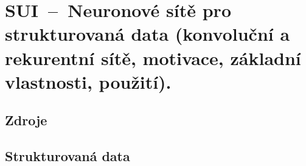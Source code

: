 

\graphicspath{{sui/neuronove_site_pro_strukturovana_data/figures}}


\chapter{SUI~--~Neuronové sítě pro strukturovaná data (konvoluční a rekurentní sítě, motivace, základní vlastnosti, použití).}


\section{Zdroje}

\begin{compactitem}
    \item {}
    \item {}
    \item {}
    \item {}
    \item {} %
\end{compactitem}


\section{Strukturovaná data}

